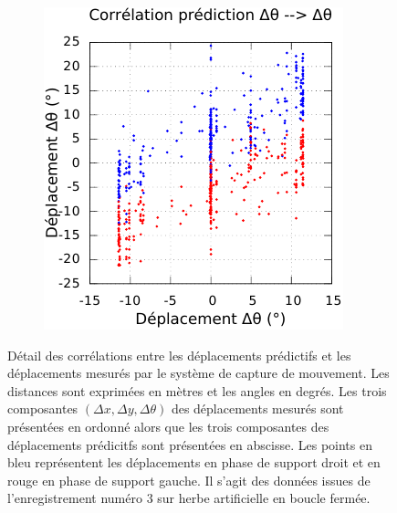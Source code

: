 \begin{figure}[htbp]
\begin{subfigure}{0.22\paperwidth}
    \end{subfigure}
    \begin{subfigure}{0.22\paperwidth}
        \centering
        \includegraphics[type=pdf,ext=.pdf,read=.pdf,width=1.0\linewidth]{../plot/OdometryLWPR/grass_close_function_goal_yaw_yaw}
    \end{subfigure}
    \caption{\label{fig:odometry_lwpr_function_goal} 
        Détail des corrélations entre les déplacements prédictifs et les déplacements
        mesurés par le système de capture de mouvement.
        Les distances sont exprimées en mètres et les angles en degrés.
        Les trois composantes $(\Delta x, \Delta y, \Delta \theta)$ des déplacements mesurés sont présentées en ordonné
        alors que les trois composantes des déplacements prédicitfs sont présentées en abscisse.
        Les points en bleu représentent les déplacements en phase de support droit et en rouge en phase de support gauche.
        Il s'agit des données issues de l'enregistrement numéro $3$ sur herbe artificielle en boucle fermée.
    }
\end{figure}

